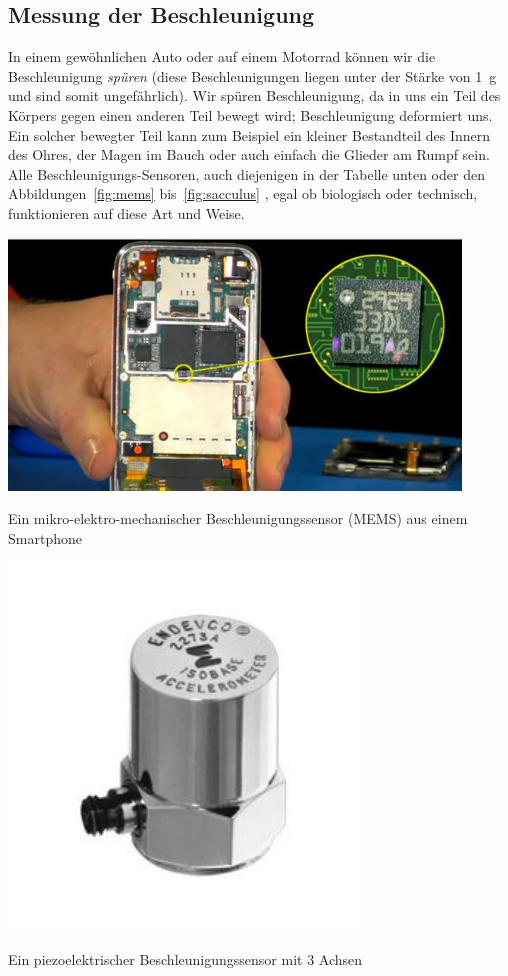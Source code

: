 \subsection{Messung der Beschleunigung} %
In einem gewöhnlichen Auto oder auf einem Motorrad können wir die Beschleunigung \textit{spüren} (diese Beschleunigungen liegen unter der Stärke von \SI{1}{g} und sind somit ungefährlich). Wir spüren Beschleunigung, da in uns ein Teil des Körpers gegen einen anderen Teil bewegt wird; Beschleunigung deformiert uns. Ein solcher bewegter Teil kann zum Beispiel ein kleiner Bestandteil des Innern des Ohres, der Magen im Bauch oder auch einfach die Glieder am Rumpf sein. Alle Beschleunigungs-Sensoren, auch diejenigen in der Tabelle unten oder den Abbildungen~\ref{fig:mems} bis~\ref{fig:sacculus} , egal ob biologisch oder technisch, funktionieren auf diese Art und Weise. 
\begin{marginfigure}
    \includegraphics[width=0.9\textwidth]{Bilder/mems.jpg}
    \caption{Ein mikro-elektro-mechanischer Beschleunigungssensor (MEMS) aus einem Smartphone}
\label{fig:mems}
\end{marginfigure}

\begin{marginfigure}
    \includegraphics[width=0.7\textwidth]{Bilder/piezo.jpg}
    \caption{Ein piezoelektrischer Beschleunigungssensor mit 3 Achsen}
\label{fig:piezo}
\end{marginfigure}

